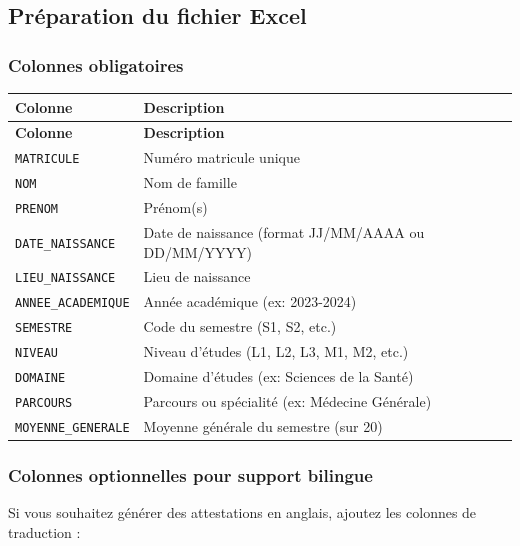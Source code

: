\subsection{Préparation du fichier Excel}

\subsubsection{Colonnes obligatoires}

\begin{tcolorbox}[colback=blue!5!white,colframe=blue!75!black,title=Colonnes obligatoires]
\begin{longtable}{|l|p{9cm}|}
\hline
\textbf{Colonne} & \textbf{Description} \\
\hline
\endfirsthead
\hline
\textbf{Colonne} & \textbf{Description} \\
\hline
\endhead
\hline
\endfoot

\texttt{MATRICULE} & Numéro matricule unique \\
\hline
\texttt{NOM} & Nom de famille \\
\hline
\texttt{PRENOM} & Prénom(s) \\
\hline
\texttt{DATE\_NAISSANCE} & Date de naissance (format JJ/MM/AAAA ou DD/MM/YYYY) \\
\hline
\texttt{LIEU\_NAISSANCE} & Lieu de naissance \\
\hline
\texttt{ANNEE\_ACADEMIQUE} & Année académique (ex: 2023-2024) \\
\hline
\texttt{SEMESTRE} & Code du semestre (S1, S2, etc.) \\
\hline
\texttt{NIVEAU} & Niveau d'études (L1, L2, L3, M1, M2, etc.) \\
\hline
\texttt{DOMAINE} & Domaine d'études (ex: Sciences de la Santé) \\
\hline
\texttt{PARCOURS} & Parcours ou spécialité (ex: Médecine Générale) \\
\hline
\texttt{MOYENNE\_GENERALE} & Moyenne générale du semestre (sur 20) \\
\hline
\end{longtable}
\end{tcolorbox}

\subsubsection{Colonnes optionnelles pour support bilingue}

Si vous souhaitez générer des attestations en anglais, ajoutez les colonnes de traduction :


